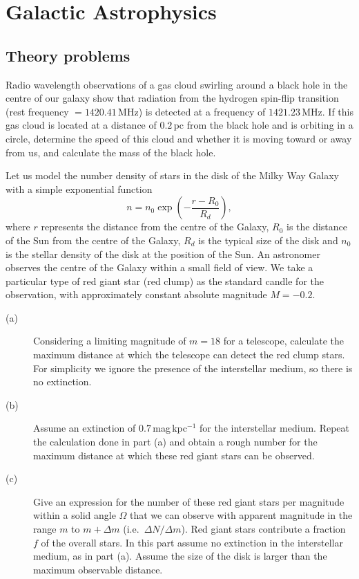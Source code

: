 \chapter{Galactic Astrophysics}

\section*{Theory problems}

Radio wavelength observations of a gas cloud swirling around a black hole in the
centre of our galaxy show that radiation from the hydrogen spin-flip transition
(rest frequency $=1420.41$\,MHz) is detected at a frequency of $1421.23$\,MHz.
If this gas cloud is located at a distance of $0.2$\,pc from the black hole and
is orbiting in a circle, determine the speed of this cloud and whether it is
moving toward or away from us, and calculate the mass of the black hole.

Let us model the number density of stars in the disk of the Milky Way Galaxy
with a simple exponential function
\[ n = n_0 \exp\!\left(-\frac{r-R_0}{R_d}\right), \]
where $r$ represents the distance from the centre of the Galaxy, $R_0$ is the
distance of the Sun from the centre of the Galaxy, $R_d$ is the typical size of
the disk and $n_0$ is the stellar density of the disk at the position of the Sun.
An astronomer observes the centre of the Galaxy within a small field of view. We
take a particular type of red giant star (red clump) as the standard candle for
the observation, with approximately constant absolute magnitude $M = -0.2$.

\begin{description}
\item[(a)] Considering a limiting magnitude of $m = 18$ for a telescope,
  calculate the maximum distance at which the telescope can detect the red clump
  stars. For simplicity we ignore the presence of the interstellar medium, so
  there is no extinction.
\item[(b)] Assume an extinction of $0.7$\,mag\,kpc$^{-1}$ for the interstellar
  medium. Repeat the calculation done in part (a) and obtain a rough number for
  the maximum distance at which these red giant stars can be observed.
\item[(c)] Give an expression for the number of these red giant stars per
  magnitude within a solid angle $\Omega$ that we can observe with apparent
  magnitude in the range $m$ to $m + \Delta m$ (i.e.\ $\Delta N/\Delta m$). Red
  giant stars contribute a fraction $f$ of the overall stars. In this part assume
  no extinction in the interstellar medium, as in part (a). Assume the size of
  the disk is larger than the maximum observable distance.
\end{description}

